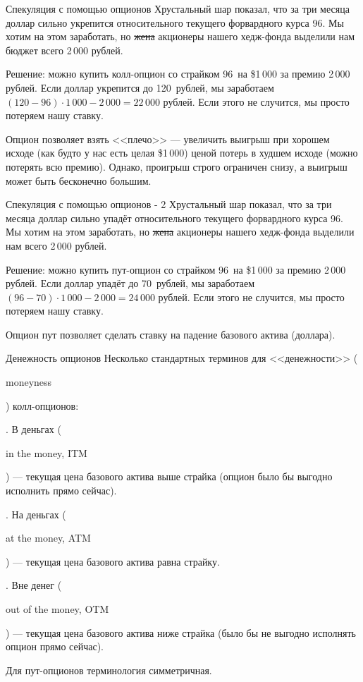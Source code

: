 \documentclass{beamer}
\newcommand{\en}[1]{\begin{otherlanguage}{english}#1\end{otherlanguage}}
\newcommand{\usdrubstrike}{96}
\newcommand{\usdrublow}{70}
\newcommand{\usdrubhigh}{120}
\newcommand{\highminusstrikepremium}{22}
\newcommand{\strikeminuslowpremium}{24}
\begin{document}
\begin{frame}{Спекуляция с помощью опционов}
\justify
Хрустальный шар показал, что за три месяца доллар сильно укрепится относительного текущего форвардного курса \usdrubstrike. Мы хотим на этом заработать, но \sout{жена} акционеры нашего хедж-фонда выделили нам бюджет всего 2\,000 рублей.

\justify
Решение: можно купить колл-опцион со страйком \usdrubstrike\ на \$1\,000 за премию 2\,000 рублей. Если доллар укрепится до \usdrubhigh\ рублей, мы заработаем $(\usdrubhigh - \usdrubstrike) \cdot 1\,000 - 2\,000 = \highminusstrikepremium\,000$ рублей. Если этого не случится, мы просто потеряем нашу ставку.

\justify
Опцион позволяет взять <<плечо>> --- увеличить выигрыш при хорошем исходе (как будто у нас есть целая \$1\,000) ценой потерь в худшем исходе (можно потерять всю премию). Однако, проигрыш строго ограничен снизу, а выигрыш может быть бесконечно большим.
\end{frame}



\begin{frame}{Спекуляция с помощью опционов - 2}
\justify
Хрустальный шар показал, что за три месяца доллар сильно упадёт относительного текущего форвардного курса \usdrubstrike. Мы хотим на этом заработать, но \sout{жена} акционеры нашего хедж-фонда выделили нам всего 2\,000 рублей.

\justify
Решение: можно купить пут-опцион со страйком \usdrubstrike\ на \$1\,000 за премию 2\,000 рублей. Если доллар упадёт до \usdrublow\ рублей, мы заработаем $(\usdrubstrike - \usdrublow) \cdot 1\,000 - 2\,000 = \strikeminuslowpremium\,000$ рублей. Если этого не случится, мы просто потеряем нашу ставку.

\justify
Опцион пут позволяет сделать ставку на падение базового актива (доллара).
\end{frame}



\begin{frame}{Денежность опционов}
\justify
Несколько стандартных терминов для <<денежности>> (\en{moneyness}) колл-опционов:

. В деньгах (\en{in the money, ITM}) --- текущая цена базового актива выше страйка (опцион было бы выгодно исполнить прямо сейчас).

. На деньгах (\en{at the money, ATM}) --- текущая цена базового актива равна страйку.

. Вне денег (\en{out of the money, OTM}) --- текущая цена базового актива ниже страйка (было бы не выгодно исполнять опцион прямо сейчас).

\justify
Для пут-опционов терминология симметричная.
\end{frame}
\end{document}
